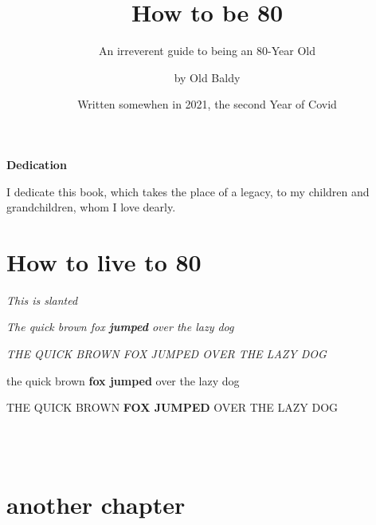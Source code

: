 \documentclass[fontsize=15pt, landscape, oneside]{scrbook}
\title{{\Huge \textbf{How to be 80}}}
\subtitle{{\normalsize An irreverent guide to being an 80-Year Old}}
\author{by Old Baldy}
\date{{\small Written somewhen in 2021, the second Year of Covid}}
\begin{document}
\begin{frontmatter}
\maketitle
\begin{center}
	{\LARGE \textbf{Dedication}}
	
	I dedicate this book, which takes the place of a legacy, to my children and grandchildren, whom I love dearly.
\end{center}
\end{frontmatter}
	\chapter*{How to live to 80}


	\textsl{This is slanted}
	
	\textit{The quick brown fox \textbf{jumped} over the lazy dog} 
	
	\textit{THE QUICK BROWN FOX JUMPED OVER THE LAZY DOG}
	
	the quick brown \textbf{fox jumped} over the lazy dog
	
	THE QUICK BROWN \textbf{FOX JUMPED} OVER THE LAZY DOG
	
	
	
	
	
	\lipsum[20-23] \\ \\
	
	\chapter*{another chapter}
	\textit{\lipsum[30-33]}
\end{document}
